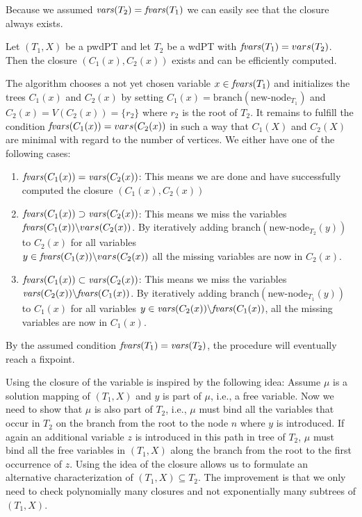 Because we assumed $\mathit{vars}(T_2) = \mathit{fvars}(T_1)$ we can easily see that the closure
always exists. 

\begin{proposition}
	Let $(T_1,X)$ be a pwdPT and let $T_2$ be a wdPT with $\mathit{fvars}(T_1) =
	vars(T_2)$. Then the closure $(C_1(x),C_2(x))$ exists and can be
	efficiently computed.
\end{proposition}
\begin{proofidea}
	The algorithm chooses a not yet chosen variable $x \in \mathit{fvars}(T_1)$ and
	initializes the trees $C_1(x)$ and $C_2(x)$ by setting $C_1(x) =
	\mbox{branch}(\mbox{new-node}_{T_1})$ and $C_2(x) = V(C_2(x)) = \{r_2\}$ where $r_2$ is
	the root of $T_2$. It remains to fulfill the condition $\mathit{fvars}(C_1(x)) =
	vars(C_2(x))$ in such a way that $C_1(X)$ and $C_2(X)$ are minimal with
	regard to the number of vertices. We either have one of the following cases:
	\begin{enumerate}
		\item $\mathit{fvars}(C_1(x)) = \mathit{vars}(C_2(x))$: This means we are done and have
			successfully computed the closure $(C_1(x), C_2(x))$
		\item $\mathit{fvars}(C_1(x)) \supset \mathit{vars}(C_2(x))$: This means we miss the
			variables\\ $\mathit{fvars}(C_1(x)) \backslash vars(C_2(x))$. By
			iteratively adding $\mbox{branch}(\mbox{new-node}_{T_2}(y))$ to $C_2(x)$ for all
			variables\\ $y \in \mathit{fvars}(C_1(x)) \backslash vars(C_2(x))$ all
			the missing variables are now in $C_2(x)$.
		\item $\mathit{fvars}(C_1(x)) \subset \mathit{vars}(C_2(x))$: This means we miss the
			variables\\ $\mathit{vars}(C_2(x)) \backslash \mathit{fvars}(C_1(x))$. By iteratively
			adding $\mbox{branch}(\mbox{new-node}_{T_1}(y))$ to $C_1(x)$ for all variables
			$y \in \mathit{vars}(C_2(x)) \backslash \mathit{fvars}(C_1(x))$, all the missing
			variables are now in $C_1(x)$.
	\end{enumerate}
	By the assumed condition $\mathit{fvars}(T_1) = \mathit{vars}(T_2)$, the procedure will
	eventually reach a fixpoint.
\end{proofidea}

Using the closure of the variable is inspired by the following idea:
Assume $\mu$ is a solution mapping of $(T_1,X)$ and $y$ is part of $\mu$, i.e.,
a free variable. Now we need to show that $\mu$ is also part of $T_2$, i.e.,
$\mu$ must bind all the variables that occur in $T_2$ on the branch from the
root to the node $n$ where $y$ is introduced. If again an additional variable
$z$ is introduced in this path in tree of $T_2$, $\mu$ must bind all the free
variables in $(T_1,X)$ along the branch from the root to the first occurrence of
$z$. Using the idea of the closure allows us to formulate an alternative characterization of
$(T_1,X) \subseteq T_2$. The improvement is that we only need to check
polynomially many closures and not exponentially many subtrees of $(T_1,X)$.

